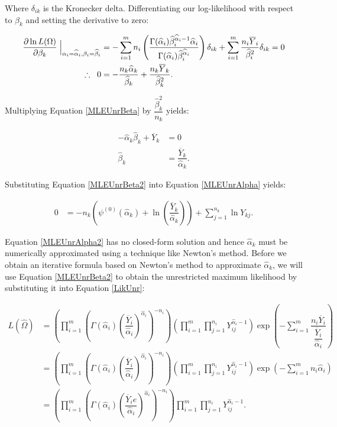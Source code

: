 \documentclass[12pt,a4paper,openright]{article}
\newcommand{\eqn}[1]{Equation \ref{#1}}
\newcommand{\ovY}{\overline{Y}}
\newcommand{\wal}{\widehat{\alpha}}
\newcommand{\wbe}{\widehat{\beta}}
\begin{document}
	Where $\delta_{ik}$ is the Kronecker delta. Differentiating our log-likelihood with respect to $\beta_k$ and setting the derivative to zero:
	
	\begin{align}
		\dfrac{\partial \ln{L(\Omega)}}{\partial \beta_k} \Bigm \lvert_{\alpha_i=\wal_i, \beta_i=\wbe_i} &= -\sum_{i=1}^m n_i \left(\dfrac{\Gamma(\wal_i)\wbe_i^{\wal_i-1}\wal_i}{\Gamma(\wal_i)\wbe_i^{\wal_i}}\right)\delta_{ik} + \sum_{i=1}^m \dfrac{n_i \ovY_i}{\wbe_i^2}\delta_{ik} = 0 \nonumber\\
		\therefore \hspace{0.2cm} 0 &= -\dfrac{n_k \wal_k}{\wbe_k} + \dfrac{n_k\ovY_k}{\wbe_k^2}. \label{MLEUnrBeta}
	\end{align}

	Multiplying \eqn{MLEUnrBeta} by $\dfrac{\wbe_k^2}{n_k}$ yields:
	
	\begin{align}
		-\wal_k \wbe_k + \ovY_k &= 0 \nonumber\\
		\wbe_k &= \dfrac{\ovY_k}{\wal_k}. \label{MLEUnrBeta2}
	\end{align}

	Substituting \eqn{MLEUnrBeta2} into \eqn{MLEUnrAlpha} yields:
	
	\begin{align}
		0 &= -n_k \left(\psi^{(0)}(\wal_k) + \ln{\left(\dfrac{\ovY_k}{\wal_k}\right)}\right) + \sum_{j=1}^{n_k} \ln{Y_{kj}}.\label{MLEUnrAlpha2}
	\end{align}

	\eqn{MLEUnrAlpha2} has no closed-form solution and hence $\wal_k$ must be numerically approximated using a technique like Newton's method. Before we obtain an iterative formula based on Newton's method to approximate $\wal_k$, we will use \eqn{MLEUnrBeta2} to obtain the unrestricted maximum likelihood by substituting it into \eqn{LikUnr}:
	
	\begin{align}
		L(\widehat{\Omega}) &= \left(\prod_{i=1}^m\left(\Gamma(\wal_i)\left(\dfrac{\ovY_i}{\wal_i}\right)^{\wal_i}\right)^{-n_i}\right) \left(\prod_{i=1}^m \prod_{j=1}^{n_i} Y_{ij}^{\wal_i-1}\right) \exp\left(-\sum_{i=1}^m \dfrac{n_i\ovY_i}{\dfrac{\ovY_i}{\wal_i}}\right) \nonumber\\
		&= \left(\prod_{i=1}^m\left(\Gamma(\wal_i)\left(\dfrac{\ovY_i}{\wal_i}\right)^{\wal_i}\right)^{-n_i}\right) \left(\prod_{i=1}^m \prod_{j=1}^{n_i} Y_{ij}^{\wal_i-1}\right) \exp\left(-\sum_{i=1}^m n_i\wal_i\right) \nonumber\\
		&= \left(\prod_{i=1}^m\left(\Gamma(\wal_i)\left(\dfrac{\ovY_i e}{\wal_i}\right)^{\wal_i}\right)^{-n_i}\right) \prod_{i=1}^m \prod_{j=1}^{n_i} Y_{ij}^{\wal_i-1}. \label{MLUnr}
	\end{align}
\end{document}
